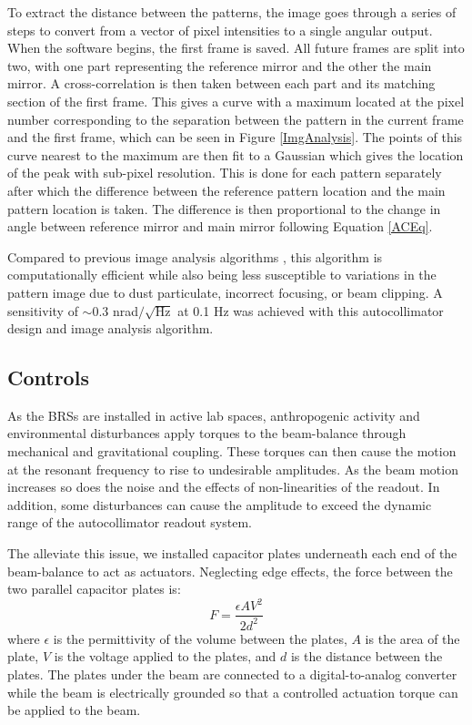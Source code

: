 \documentclass [12pt, proquest]{uwthesis}[2019]
\begin{document}
To extract the distance between the patterns, the image goes through a series of steps to convert from a vector of pixel intensities to a single angular output. When the software begins, the first frame is saved. All future frames are split into two, with one part representing the reference mirror and the other the main mirror. A cross-correlation is then taken between each part and its matching section of the first frame. This gives a curve with a maximum located at the pixel number corresponding to the separation between the pattern in the current frame and the first frame, which can be seen in Figure \ref{ImgAnalysis}. The points of this curve nearest to the maximum are then fit to a Gaussian which gives the location of the peak with sub-pixel resolution. This is done for each pattern separately after which the difference between the reference pattern location and the main pattern location is taken. The difference is then proportional to the change in angle between reference mirror and main mirror following Equation \ref{ACEq}.

Compared to previous image analysis algorithms \cite{MSA}, this algorithm is computationally efficient while also being less susceptible to variations in the pattern image due to dust particulate, incorrect focusing, or beam clipping. A sensitivity of $\sim$0.3 nrad$/\sqrt{\text{Hz}}$ at 0.1 Hz was achieved with this autocollimator design and image analysis algorithm.

\subsection{Controls}

\quad As the BRSs are installed in active lab spaces, anthropogenic activity and environmental disturbances apply torques to the beam-balance through mechanical and gravitational coupling. These torques can then cause the motion at the resonant frequency to rise to undesirable amplitudes. As the beam motion increases so does the noise and the effects of non-linearities of the readout. In addition, some disturbances can cause the amplitude to exceed the dynamic range of the autocollimator readout system.

The alleviate this issue, we installed capacitor plates underneath each end of the beam-balance to act as actuators. Neglecting edge effects, the force between the two parallel capacitor plates is: 
\begin{equation}
F=\frac{\epsilon A V^2}{2d^2} \label{cap}
\end{equation}
where $\epsilon$ is the permittivity of the volume between the plates, $A$ is the area of the plate, $V$ is the voltage applied to the plates, and $d$ is the distance between the plates. The plates under the beam are connected to a digital-to-analog converter while the beam is electrically grounded so that a controlled actuation torque can be applied to the beam. 
\end{document}
